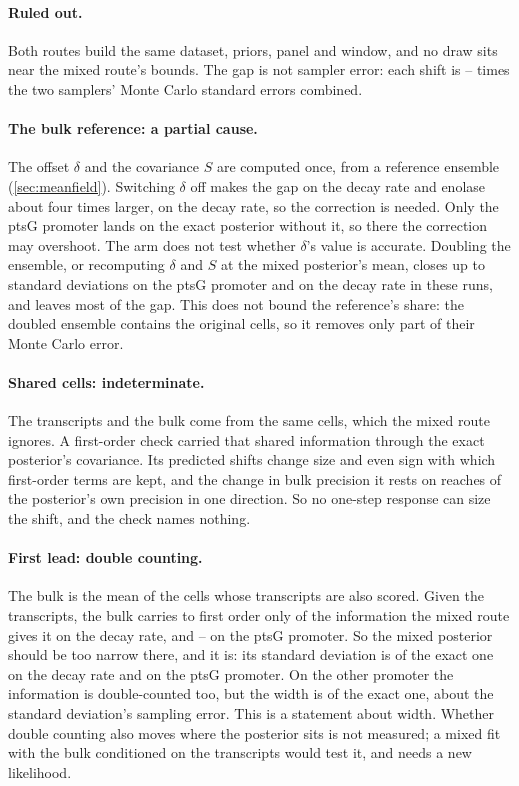 \paragraph{Ruled out.} Both routes build the same dataset, priors, panel and window, and no
draw sits near the mixed route's bounds. The gap is not sampler error: each shift is
-- times the two samplers' Monte Carlo standard errors combined.

\paragraph{The bulk reference: a partial cause.} The offset $\delta$ and the covariance $S$ are
computed once, from a reference ensemble (\cref{sec:meanfield}). Switching $\delta$ off makes
the gap on the decay rate and enolase about four times larger,  on the decay
rate, so the correction is needed. Only the ptsG promoter lands on the exact posterior without
it, so there the correction may overshoot. The arm does not test whether $\delta$'s value is
accurate. Doubling the ensemble, or recomputing $\delta$ and $S$ at the mixed posterior's mean,
closes up to  standard deviations on the ptsG promoter and  on
the decay rate in these runs, and leaves most of the gap. This does not bound the reference's
share: the doubled ensemble contains the original  cells, so it removes only part
of their Monte Carlo error.

\paragraph{Shared cells: indeterminate.} The transcripts and the bulk come from the same cells,
which the mixed route ignores. A first-order check carried that shared information through the
exact posterior's covariance. Its predicted shifts change size and even sign with which
first-order terms are kept, and the change in bulk precision it rests on reaches
 of the posterior's own precision in one direction. So no one-step response
can size the shift, and the check names nothing.

\paragraph{First lead: double counting.} The bulk is the mean of the cells whose transcripts
are also scored. Given the transcripts, the bulk carries to first order only  of
the information the mixed route gives it on the decay rate, and
-- on the ptsG promoter. So the mixed posterior should be too
narrow there, and it is: its standard deviation is  of the exact one on the
decay rate and  on the ptsG promoter. On the other promoter the information is
double-counted too, but the width is  of the exact one, about the standard
deviation's sampling error. This is a statement about width. Whether double counting also moves
where the posterior sits is not measured; a mixed fit with the bulk conditioned on the
transcripts would test it, and needs a new likelihood.

